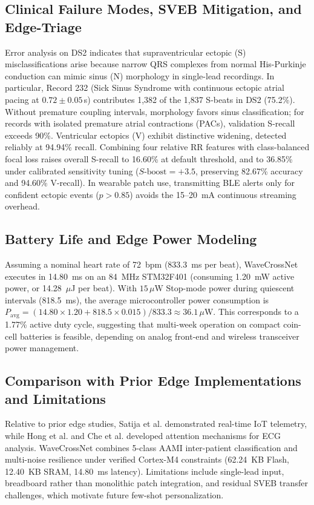 \documentclass[conference]{IEEEtran}
\begin{document}
\subsection{Clinical Failure Modes, SVEB Mitigation, and Edge-Triage}
Error analysis on DS2 indicates that supraventricular ectopic (S) misclassifications arise because narrow QRS complexes from normal His-Purkinje conduction can mimic sinus (N) morphology in single-lead recordings. In particular, Record 232 (Sick Sinus Syndrome with continuous ectopic atrial pacing at $0.72 \pm 0.05$\,s) contributes 1,382 of the 1,837 S-beats in DS2 (75.2\%). Without premature coupling intervals, morphology favors sinus classification; for records with isolated premature atrial contractions (PACs), validation S-recall exceeds 90\%. Ventricular ectopics (V) exhibit distinctive widening, detected reliably at 94.94\% recall. Combining four relative RR features with class-balanced focal loss raises overall S-recall to 16.60\% at default threshold, and to 36.85\% under calibrated sensitivity tuning ($S\text{-boost} = +3.5$, preserving 82.67\% accuracy and 94.60\% V-recall). In wearable patch use, transmitting BLE alerts only for confident ectopic events ($p > 0.85$) avoids the 15--20~mA continuous streaming overhead.

\subsection{Battery Life and Edge Power Modeling}
Assuming a nominal heart rate of 72~bpm (833.3~ms per beat), WaveCrossNet executes in 14.80~ms on an 84~MHz STM32F401 (consuming 1.20~mW active power, or 14.28~$\mu$J per beat). With $15\,\mu\text{W}$ Stop-mode power during quiescent intervals (818.5~ms), the average microcontroller power consumption is $P_{\text{avg}} = (14.80 \times 1.20 + 818.5 \times 0.015) / 833.3 \approx 36.1\,\mu\text{W}$. This corresponds to a 1.77\% active duty cycle, suggesting that multi-week operation on compact coin-cell batteries is feasible, depending on analog front-end and wireless transceiver power management.

\subsection{Comparison with Prior Edge Implementations and Limitations}
Relative to prior edge studies, Satija et al. \cite{satija2018real} demonstrated real-time IoT telemetry, while Hong et al. \cite{hong2020mina} and Che et al. \cite{che2021constrained} developed attention mechanisms for ECG analysis. WaveCrossNet combines 5-class AAMI inter-patient classification and multi-noise resilience under verified Cortex-M4 constraints (62.24~KB Flash, 12.40~KB SRAM, 14.80~ms latency). Limitations include single-lead input, breadboard rather than monolithic patch integration, and residual SVEB transfer challenges, which motivate future few-shot personalization.
\end{document}
